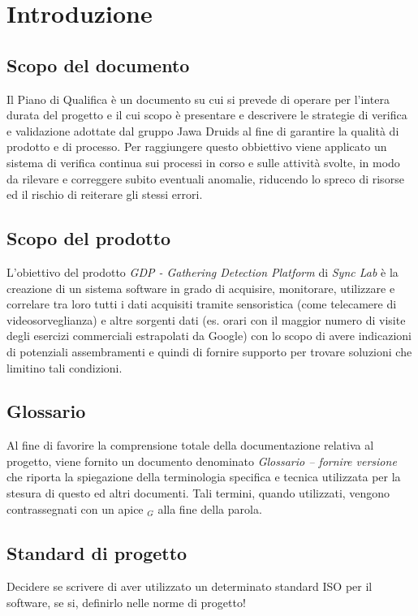 \chapter{Introduzione}\label{Introduzione}

\section{Scopo del documento}\label{IntroduzioneScopoDelDocumento}
Il Piano di Qualifica è un documento su cui si prevede di operare per l’intera durata del progetto 
e il cui scopo è presentare e descrivere le strategie di verifica e validazione adottate 
dal gruppo Jawa Druids al fine di garantire la qualità di prodotto e di processo.  
Per raggiungere questo obbiettivo viene applicato un sistema di verifica continua sui processi in corso e 
sulle attività svolte, in modo da rilevare e correggere subito eventuali anomalie, riducendo lo spreco di risorse 
ed il rischio di reiterare gli stessi errori.
\section{Scopo del prodotto}\label{IntroduzioneScopoDelProdotto}
L'obiettivo del prodotto \textit{GDP - Gathering Detection Platform} di \textit{Sync Lab} è la creazione di un sistema software in 
grado di acquisire, monitorare, utilizzare e correlare tra loro tutti i dati acquisiti tramite sensoristica (come telecamere di videosorveglianza)
e altre sorgenti dati (es. orari con il maggior numero di visite degli esercizi commerciali estrapolati da Google) con lo
scopo di avere indicazioni di potenziali assembramenti e quindi di fornire supporto per trovare soluzioni che limitino tali condizioni.
\section{Glossario}\label{IntroduzioneGlossario}
Al fine di favorire la comprensione totale della documentazione relativa al progetto, viene fornito un documento denominato \textit{Glossario -- fornire versione}
che riporta la spiegazione della terminologia specifica e tecnica utilizzata per la stesura di questo ed altri documenti.
Tali termini, quando utilizzati, vengono contrassegnati con un apice $_G$ alla fine della parola.
\section{Standard di progetto}\label{IntroduzioneStandardDiProgetto}
Decidere se scrivere di aver utilizzato un determinato standard ISO per il software, se si, definirlo nelle norme di progetto!
